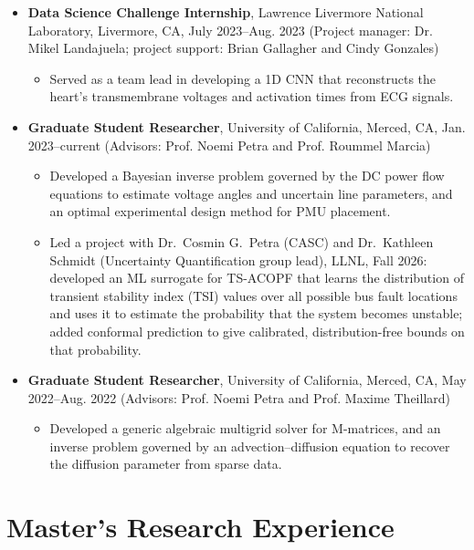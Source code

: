 \documentclass[11pt]{article}
\begin{document}
\begin{itemize}
\begin{itemize}
    electrocardiography (ECG) signals, identify the type of
    irregularity, and estimate cardiac activation times.
  \end{itemize}
\item {\bf Data Science Challenge Internship}, Lawrence Livermore
  National Laboratory, Livermore, CA, July 2023--Aug. 2023 (Project
  manager: Dr. Mikel Landajuela; project support: Brian Gallagher and
  Cindy Gonzales)
  \begin{itemize}
  \item Served as a team lead in developing a 1D CNN that reconstructs
    the heart's transmembrane voltages and activation times from ECG
    signals.
  \end{itemize}
\item {\bf Graduate Student Researcher}, University of California,
  Merced, CA, Jan. 2023--current (Advisors: Prof. Noemi Petra and
  Prof. Roummel Marcia)
  \begin{itemize}
  \item Developed a Bayesian inverse problem governed by the DC power
    flow equations to estimate voltage angles and uncertain line
    parameters, and an optimal experimental design method for PMU
    placement.
  \item Led a project with Dr.\ Cosmin G.\ Petra (CASC) and Dr.\ Kathleen
    Schmidt (Uncertainty Quantification group lead), LLNL, Fall 2026:
    developed an ML surrogate for TS-ACOPF that learns the distribution of
    transient stability index (TSI) values over all possible bus fault
    locations and uses it to estimate the probability that the system
    becomes unstable; added conformal prediction to give calibrated,
    distribution-free bounds on that probability.
  \end{itemize}
\item {\bf Graduate Student Researcher}, University of California,
  Merced, CA, May 2022--Aug. 2022 (Advisors: Prof. Noemi Petra and
  Prof. Maxime Theillard)
  \begin{itemize}
  \item Developed a generic algebraic multigrid solver for M-matrices,
    and an inverse problem governed by an advection--diffusion equation
    to recover the diffusion parameter from sparse data.
  \end{itemize}
\end{itemize}

\section*{Master's Research Experience}
\end{document}

